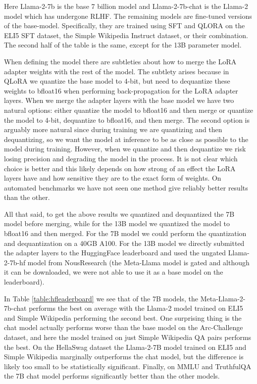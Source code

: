 \documentclass[11pt, oneside]{article}   	%
\begin{document}
Here Llama-2-7b is the base 7 billion model and Llama-2-7b-chat is the Llama-2 model which has undergone RLHF.
The remaining models are fine-tuned versions of the base-model. 
Specifically, they are trained using SFT and QLORA on the ELI5 SFT dataset, the Simple Wikipedia Instruct dataset, or their combination. The second half of the table is the same, except for the 13B parameter model.

When defining the model there are subtleties about how to merge the LoRA adapter weights with the rest of the model.
The subtlety arises because in QLoRA we quantize the base model to 4-bit, but need to dequantize these weights to bfloat16 when performing back-propagation for the LoRA adapter layers.
When we merge the adapter layers with the base model we have two natural options: either quantize the model to bfloat16 and then merge or quantize the model to 4-bit, dequantize to bfloat16, and then merge.
The second option is arguably more natural since during training we are quantizing and then dequantizing, so we want the model at inference to be as close as possible to the model during training.
However, when we quantize and then dequantize we risk losing precision and degrading the model in the process.
It is not clear which choice is better and this likely depends on how strong of an effect the LoRA layers have and how sensitive they are to the exact form of weights. 
On automated benchmarks we have not seen one method give reliably better results than the other.

All that said, to get the above results we quantized and dequantized the 7B model before merging, while for the 13B model we quantized the model to bfloat16 and then merged. 
For the 7B model we could perform the quantization and dequantization on a 40GB A100.
For the 13B model we directly submitted the adapter layers to the HuggingFace leaderboard and used the ungated Llama-2-7b-hf model from NousResearch (the Meta-Llama model is gated and although it can be downloaded, we were not able to use it as a base model on the leaderboard).

In Table \ref{table:hfleaderboard} we see that of the 7B models, the Meta-Llama-2-7b-chat performs the best on average with the Llama-2 model trained on ELI5 and Simple Wikipedia performing the second best.
One surprising thing is the chat model actually performs worse than the base model on the Arc-Challenge dataset, and here the model trained on just Simple Wikipedia QA pairs performs the best. 
On the HellaSwag dataset the Llama-2-7B model trained on ELI5 and Simple Wikipedia marginally outperforms the chat model, but the difference is likely too small to be statistically significant.
Finally, on MMLU and TruthfulQA the 7B chat model performs significantly better than the other models.
\end{document}

